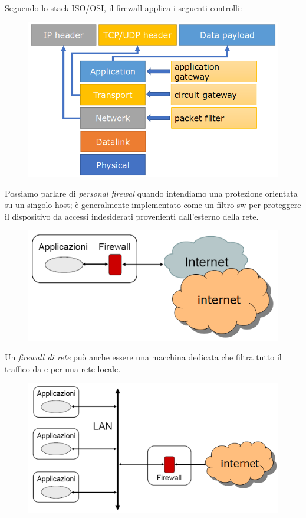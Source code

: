 \noindent Seguendo lo stack ISO/OSI, il firewall applica i seguenti controlli:
\begin{figure}[H]
    \centering
    \includegraphics[width=0.8\linewidth]{chapters/11/images/controlli.png}
\end{figure}

\noindent Possiamo parlare di \textit{personal firewal} quando intendiamo una protezione 
orientata su un singolo host; è generalmente implementato come un filtro sw per 
proteggere il dispositivo da accessi indesiderati provenienti dall'esterno della rete.

\begin{figure}[H]
    \centering
    \includegraphics[width=0.6\linewidth]{chapters/11/images/personal-fw.png}
\end{figure}

\noindent Un \textit{firewall di rete} può anche essere una macchina dedicata che filtra tutto 
il traffico da e per una rete locale.

\begin{figure}[H]
    \centering
    \includegraphics[width=0.6\linewidth]{chapters/11/images/fw.png}
\end{figure}


